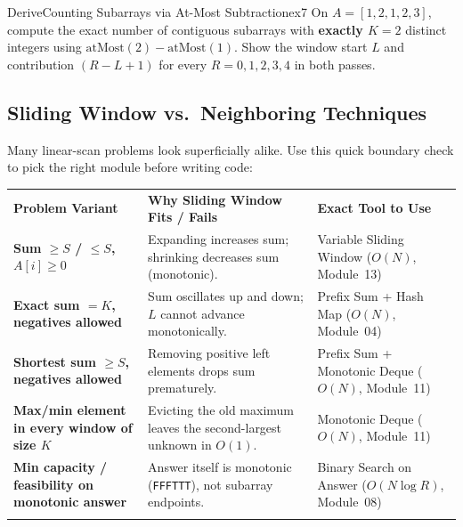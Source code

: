 \documentclass[11pt,a4paper]{article}
\theoremstyle{definition}
\begin{document}
\begin{tryitbox}{Derive}{Counting Subarrays via At-Most Subtraction}{ex7}
On $A = [1, 2, 1, 2, 3]$, compute the exact number of contiguous subarrays with \textbf{exactly $K = 2$} distinct integers using $\text{atMost}(2) - \text{atMost}(1)$. Show the window start $L$ and contribution $(R - L + 1)$ for every $R = 0, 1, 2, 3, 4$ in both passes.
\end{tryitbox}

\subsection{Sliding Window vs.\ Neighboring Techniques}

Many linear-scan problems look superficially alike. Use this quick boundary check to pick the right module before writing code:

\begingroup\small{}
\begin{tabularx}{\textwidth}{>{\raggedright\arraybackslash\bfseries}p{3.9cm} >{\raggedright\arraybackslash}p{4.1cm} >{\raggedright\arraybackslash}X}
\arrayrulecolor{primaryblue}\toprule[1.2pt]
\rowcolor{primaryblue!10}
\textcolor{primaryblue}{\textbf{Problem Variant}} & \textcolor{primaryblue}{\textbf{Why Sliding Window Fits / Fails}} & \textcolor{primaryblue}{\textbf{Exact Tool to Use}} \\
\arrayrulecolor{codeframe}\midrule[0.6pt]
Sum $\ge S$ / $\le S$, $A[i] \ge 0$ & Expanding increases sum; shrinking decreases sum (monotonic). & Variable Sliding Window ($O(N)$, Module~13) \\
Exact sum $= K$, negatives allowed & Sum oscillates up and down; $L$ cannot advance monotonically. & Prefix Sum + Hash Map ($O(N)$, Module~04) \\
Shortest sum $\ge S$, negatives allowed & Removing positive left elements drops sum prematurely. & Prefix Sum + Monotonic Deque ($O(N)$, Module~11) \\
Max/min element in every window of size $K$ & Evicting the old maximum leaves the second-largest unknown in $O(1)$. & Monotonic Deque ($O(N)$, Module~11) \\
Min capacity / feasibility on monotonic answer & Answer itself is monotonic (\texttt{FFFTTT}), not subarray endpoints. & Binary Search on Answer ($O(N \log R)$, Module~08) \\
\arrayrulecolor{primaryblue}\bottomrule[1.2pt]
\end{tabularx}\endgroup
\end{document}

